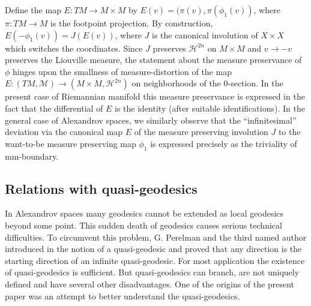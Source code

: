 \documentclass[12pt,leqno]{amsart}
\numberwithin{equation}{section}
\theoremstyle{definition}
\theoremstyle{remark}
\begin{document}
Define the map $E:TM\to M\times M$  by $E(v)=(\pi (v), \pi (\phi _1 (v))$, where $\pi:TM\to M$ is the footpoint projection.  By construction, $E(-\phi_1(v))= J(E(v))$, where
$J$ is the canonical involution of $X\times X$ which switches the coordinates. Since $J$ preserves $\mathcal H^{2n}$ on $M\times M$ and $v\to -v$ preserves the Liouville measure,
the statement about the measure preservance of $\phi$ hinges upon the smallness of measure-distortion of the map $E :(TM,\mathcal M) \to (M\times M, \mathcal H^{2n})$ on neighborhoods of the $0$-section.
In the present case of Riemannian manifold this measure preservance is expressed in  the fact that the differential of $E$ is the identity (after suitable identifications).
In the general case of Alexandrov spaces, we similarly observe that the ``infinitesimal'' deviation via the canonical map $E$ of the measure preserving involution $J$ to the want-to-be measure preserving map $\phi _1$
is expressed precisely as the triviality of  mm-boundary.












\subsection{Relations with quasi-geodesics}
In Alexandrov spaces  many geodesics cannot be extended as local geodesics beyond some point.
This sudden death  of geodesics  causes  serious technical difficulties. To circumvent this problem,
G. Perelman and the third named author introduced in \cite{PP} the notion of a quasi-geodesic and proved
that any direction is the starting direction of an infinite quasi-geodesic. For most application the
existence of quasi-geodesics is sufficient.
 But quasi-geodesics can branch, are not uniquely defined  and have several other disadvantages.
One of the origins of the present paper was an
attempt to better understand the quasi-geodesics.
\end{document}
